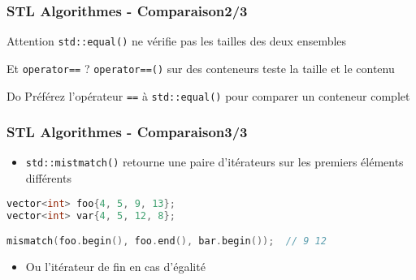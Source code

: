 \documentclass[C++.tex]{subfiles}
\begin{document}
\begin{frame}[fragile]
	\frametitle{STL Algorithmes - Comparaison\titlehfill{}2/3}
	\begin{alertblock}{Attention}
		\lstinline|std::equal()| ne vérifie pas les tailles des deux ensembles
	\end{alertblock}


	\begin{block}{Et \lstinline|operator==| ?}
		\lstinline|operator==()| sur des conteneurs teste la taille et le contenu
	\end{block}

	\begin{exampleblock}{Do}
		Préférez l'opérateur \lstinline|==| à \lstinline|std::equal()| pour comparer un conteneur complet
	\end{exampleblock}
\end{frame}

\begin{frame}[fragile]
	\frametitle{STL Algorithmes - Comparaison\titlehfill{}3/3}
	\begin{itemize}
		\item \lstinline|std::mistmatch()| retourne une paire d'itérateurs sur les premiers éléments différents
	\end{itemize}

	\begin{lstlisting}[language=C++]
vector<int> foo{4, 5, 9, 13};
vector<int> var{4, 5, 12, 8};

mismatch(foo.begin(), foo.end(), bar.begin());  // 9 12\end{lstlisting}

	\begin{itemize}
		\item Ou l'itérateur de fin en cas d'égalité
	\end{itemize}
\end{frame}
\end{document}
